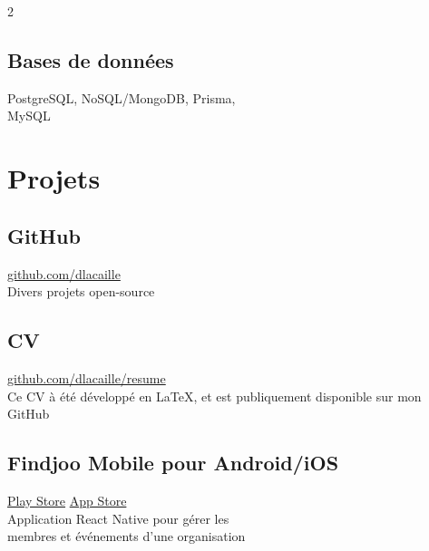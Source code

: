\documentclass{article}
\begin{document}
\begin{paracol}{2}
\begin{leftcolumn}
    \subsection{Bases de données}
    PostgreSQL, NoSQL/MongoDB, Prisma, \\
    MySQL

    \section{Projets}

    \subsection{GitHub}
    \href{https://github.com/dlacaille}{\faGithub\hspace{0.5em}github.com/dlacaille}\\
    Divers projets open-source
    
    \vspace{0.5em}
    
    \subsection{CV}
    \href{https://github.com/dlacaille/resume}{\faNewspaper[regular]\hspace{0.5em}github.com/dlacaille/resume}\\
    Ce CV à été développé en LaTeX, et est publiquement disponible sur mon GitHub

    \vspace{0.5em}

    \subsection{Findjoo Mobile pour Android/iOS}
    \href{https://play.google.com/store/apps/details?id=com.findjoomobile}{\faGooglePlay\hspace{0.5em}Play Store}\hspace{1em}
    \href{https://apps.apple.com/us/app/findjoo/id1499583717}{\faAppStore\hspace{0.5em}App Store}\\
    Application React Native pour gérer les \\
    membres et événements d'une organisation


\end{leftcolumn}
\end{paracol}
\end{document}
